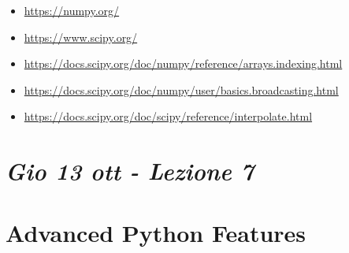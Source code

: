 \vfill

\begin{tcolorbox}[width=\textwidth,colback={white},title={References },colbacktitle=gray,coltitle=black]
  \begin{itemize}
  \item \url{https://numpy.org/}
  \item \url{https://www.scipy.org/}
  \item \url{https://docs.scipy.org/doc/numpy/reference/arrays.indexing.html}
  \item \url{https://docs.scipy.org/doc/numpy/user/basics.broadcasting.html}
  \item \url{https://docs.scipy.org/doc/scipy/reference/interpolate.html}
  \end{itemize}
\end{tcolorbox}

\newpage


\section{\textit{Gio 13 ott - Lezione 7}}

\section{Advanced Python Features}


